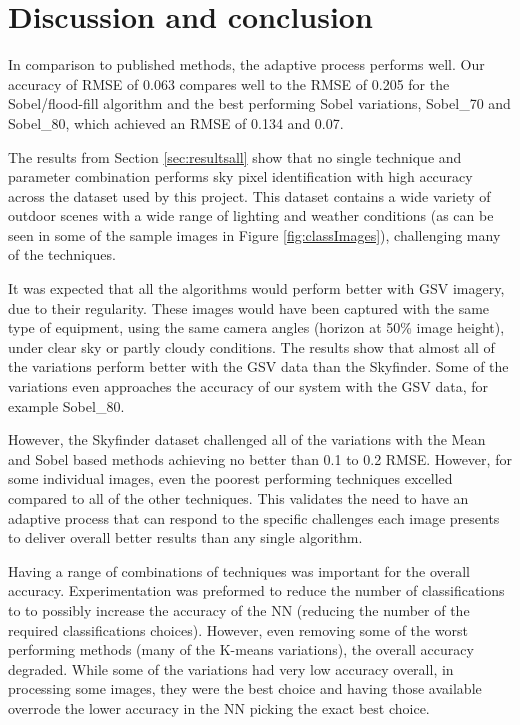 \documentclass[final,3p,times,authoryear]{elsarticle}
\begin{document}
\section{Discussion and conclusion}\label{sec:conclusion}

In comparison to published methods, the adaptive process performs well. Our accuracy of RMSE of 0.063 compares well to the RMSE of 0.205 for the \cite{Middel2018} Sobel/flood-fill algorithm and the best performing \cite{Wang2015a} Sobel variations, Sobel\_70 and Sobel\_80, which achieved an RMSE of 0.134 and 0.07.


The results from Section \ref{sec:resultsall} show that no single technique and parameter combination performs sky pixel identification with high accuracy across the dataset used by this project. This dataset contains a wide variety of outdoor scenes with a wide range of lighting and weather conditions (as can be seen in some of the sample images in Figure \ref{fig:classImages}), challenging many of the techniques. 

It was expected that all the algorithms would perform better with GSV imagery, due to their regularity. These images would have been captured with the same type of equipment, using the same camera angles (horizon at 50\% image height), under clear sky or partly cloudy conditions. The results show that almost all of the variations perform better with the GSV data than the Skyfinder. Some of the variations even approaches the accuracy of our system with the GSV data, for example Sobel\_80. 

However, the Skyfinder dataset challenged all of the variations with the Mean and Sobel based methods achieving no better than 0.1 to 0.2 RMSE. However, for some individual images, even the poorest performing techniques excelled compared to all of the other techniques. This validates the need to have an adaptive process that can respond to the specific challenges each image presents to deliver overall better results than any single algorithm.

Having a range of combinations of techniques was important for the overall accuracy. Experimentation was preformed to reduce the number of classifications to to possibly increase the accuracy of the NN (reducing the number of the required classifications choices). However, even removing some of the worst performing methods (many of the K-means variations), the overall accuracy degraded. While some of the variations had very low accuracy overall, in processing some images, they were the best choice and having those available overrode the lower accuracy in the NN picking the exact best choice.
\end{document}
